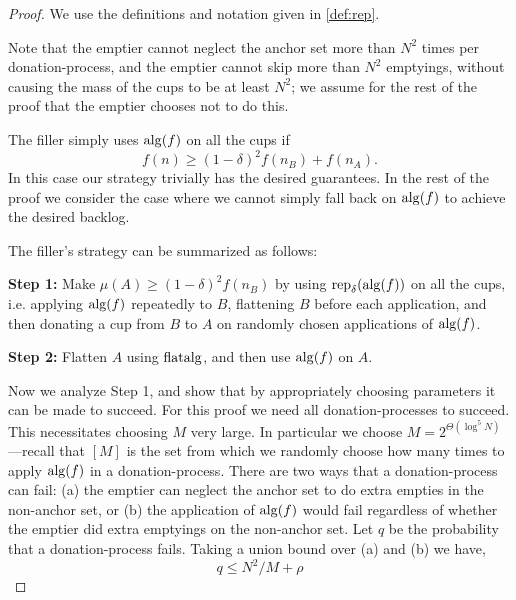 \begin{proof}
  We use the definitions and notation given in \cref{def:rep}. 

  Note that the emptier cannot neglect the anchor set more than
  $N^2$ times per donation-process, and the emptier cannot skip
  more than $N^2$ emptyings, without causing the mass of the cups
  to be at least $N^2$; we assume for the rest of the proof that
  the emptier chooses not to do this.

  The filler simply uses $\operatorname{\text{\textup{alg}}}(f)$ on all the cups if 
  $$f(n) \ge (1-\delta)^2 f(n_B) + f(n_A).$$
  In this case our strategy trivially has the desired guarantees. 
  In the rest of the proof we consider the case where we cannot
  simply fall back on $\operatorname{\text{\textup{alg}}}(f)$ to achieve the desired backlog.

  The filler's strategy can be summarized as follows:

  \vspace{.3cm}
  \noindent\textbf{Step 1:} Make $\mu(A) \ge (1-\delta)^2 f(n_B)$ by
  using $\operatorname{\text{\textup{rep}}}_\delta(\operatorname{\text{\textup{alg}}}(f))$ on all the cups,
  i.e. applying $\operatorname{\text{\textup{alg}}}(f)$ repeatedly to $B$, flattening $B$ before
  each application, and then donating a cup from $B$ to $A$ on
  randomly chosen applications of $\operatorname{\text{\textup{alg}}}(f)$.

  \vspace{.3cm}
  \noindent\textbf{Step 2:} Flatten $A$ using $\operatorname{\text{\textup{flatalg}}}$, and then use
  $\operatorname{\text{\textup{alg}}}(f)$ on $A$.
  \vspace{.3cm}

  Now we analyze Step 1, and show that by appropriately choosing
  parameters it can be made to succeed. For this proof we need
  all donation-processes to succeed. This necessitates choosing
  $M$ very large. In particular we choose $M = 2^{\Theta(\log^5
  N)}$---recall that $[M]$ is the set from which we randomly choose
  how many times to apply $\operatorname{\text{\textup{alg}}}(f)$ in a donation-process. 
  There are two ways that a donation-process can fail: (a) the
  emptier can neglect the anchor set to do extra empties in the
  non-anchor set, or (b) the application of $\operatorname{\text{\textup{alg}}}(f)$ would fail
  regardless of whether the emptier did extra emptyings on the
  non-anchor set. Let $q$ be the probability that a
  donation-process fails. Taking a union bound over (a) and (b)
  we have,
  $$q \le N^2/M + \rho$$


\end{proof}
